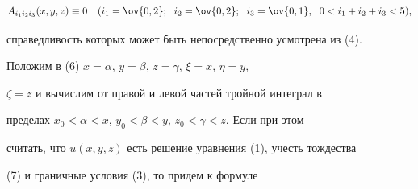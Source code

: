 \begin{equation} 


A_{i_1i_2i_3}(x,y,z)\equiv0\quad 


(i_1=\ov{0,2};\ \; i_2=\ov{0,2};\ \; i_3=\ov{0,1}, 


\ \; 0<i_1+i_2+i_3<5), 


\end{equation} 


справедливость которых может быть непосредственно усмотрена из (4). 


 


Положим в (6) $x=\alpha$, $y=\beta$, $z=\gamma$, $\xi=x$, $\eta=y$, 


$\zeta=z$ и вычислим от правой и левой частей тройной интеграл в 


пределах $x_0<\alpha<x$, $y_0<\beta<y$, $z_0<\gamma<z$. Если при этом 


считать, что $u(x,y,z)$ есть решение уравнения (1), учесть тождества 


(7) и граничные условия (3), то придем к формуле 



